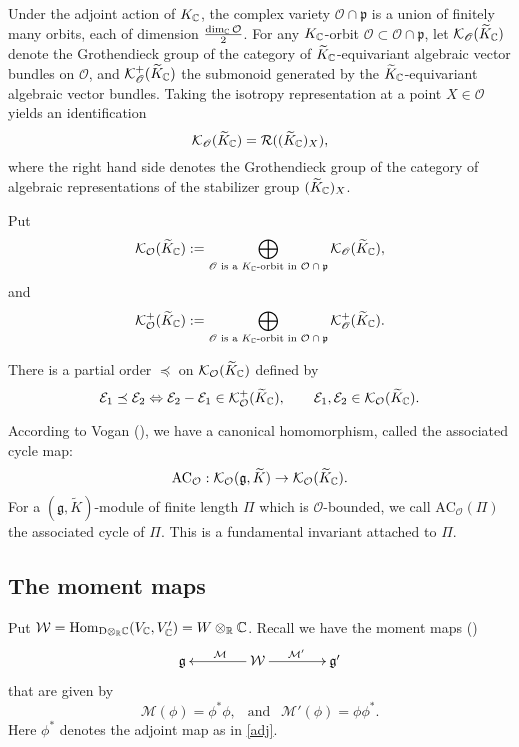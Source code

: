 \documentclass[lang = american]{ems-icm} %
\newcommand{\R}{\mathbb R}
\newcommand{\Hom}{\operatorname{Hom}}
\newcommand{\g}{\mathfrak g}
\newcommand{\p}{\mathfrak p}
\newcommand{\rD}{\mathrm D}
\newcommand{\CE}{{\mathcal {E}}}
\newcommand{\CK}{{\mathcal {K}}}
\newcommand{\CM}{{\mathcal {M}}}
\newcommand{\CO}{{\mathcal {O}}}
\newcommand{\CR}{{\mathcal {R}}}
\newcommand{\CW}{{\mathcal {W}}}
\newcommand{\sO}{\mathscr{O}}
\numberwithin{equation}{section}
\theoremstyle{remark}
\begin{document}
Under the adjoint action of $K_{\mathbb{C}}$, the complex variety $\CO\cap \p$ is a union of finitely many
orbits, each of dimension $\frac{\dim_\C \CO}{2}$.  For any $K_{\mathbb{C}}$-orbit
$\sO\subset \CO\cap \p$, let $\CK_{\sO}(\widetilde{K}_{\C})$ denote the Grothendieck group of the category of $\widetilde{K}_{\mathbb{C}}$-equivariant algebraic vector bundles on $\sO$,
and $\CK^+_{\sO}(\widetilde{K}_{\C})$ the submonoid generated by the $\widetilde{K}_{\mathbb{C}}$-equivariant algebraic vector bundles.
Taking the isotropy representation at a point $X\in \sO$ yields an identification
\begin{equation*}
  \CK_{\sO}(\widetilde{K}_{\C})=\CR((\widetilde{K}_{\C})_{X}),
\end{equation*}
where the right hand side denotes the Grothendieck group of the category of algebraic representations of the stabilizer group $(\widetilde{K}_{\mathbb{C}})_X$.

Put
\begin{equation*}
  \CK_{\CO}(\widetilde{K}_{\C}):=\bigoplus_{\sO\textrm{ is a $K_{\C}$-orbit in $\CO\cap \p$}}
  \mathrm \CK_{\sO}(\widetilde{K}_{\C}),
\end{equation*}
and
\begin{equation*}
  \CK^+_{\CO}(\widetilde{K}_{\C}):=\bigoplus_{\sO\textrm{ is a $K_{\C}$-orbit in $\CO\cap \p$}}
  \mathrm \CK^+_{\sO}(\widetilde{K}_{\C}).
  \end{equation*}



 There is a partial order $\preceq $ on $\CK_{\CO}(\widetilde{K}_{\C})$ defined by
\[
  \CE_1\preceq \CE_2\Leftrightarrow \CE_2-\CE_1\in \CK^+_{\CO}(\widetilde{K}_{\C}),
  \qquad \CE_1, \CE_2\in \CK_{\CO}(\widetilde{K}_{\C}).
\]

According to Vogan (\cite[Theorem~2.13]{VoUni}),  we have a canonical homomorphism, called the associated cycle map:
\[
  \mathrm{AC}_{\CO}: \CK_{\CO}(\g, \widetilde{K})\rightarrow \CK_{\CO}(\widetilde{K}_{\C}).
  \]
For a $(\g,\widetilde{K})$-module of finite length $\Pi$ which is $\CO$-bounded, we call $ \mathrm{AC}_\CO(\Pi)$ the associated cycle of $\Pi$. This is a fundamental invariant attached to $\Pi$.



\subsection{The moment maps}

Put $\CW=\Hom_{\rD\otimes_\R \C}(V_\C,{V}'_\C)=W\otimes_\R \C$.
Recall we have the moment maps (\cites{KP,DKPC})
\[
    \xymatrix@R=0em@C=4em{
      \g &\ar[l]_{\CM }\CW\ar[r]^{\CM' }& \g'
    }
  \]
  that are given by
  \[\CM (\phi)= \phi^{*}\phi, \ \ \text{ and } \ \ \CM '(\phi)=\phi \phi ^{*}.\]
  Here $\phi ^{*}$ denotes the adjoint map as in \eqref{adj}.
\end{document}
